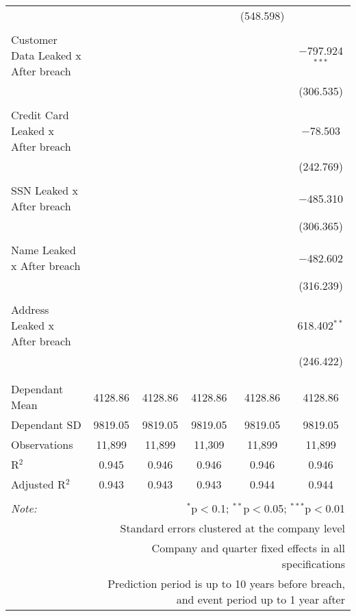 \begin{table}[!htbp]
\begin{tabular}{@{\extracolsep{5pt}}lccccc}
  &  &  &  & (548.598) &  \\ 
  & & & & & \\ 
 Customer Data Leaked x After breach &  &  &  &  & $-$797.924$^{***}$ \\ 
  &  &  &  &  & (306.535) \\ 
  & & & & & \\ 
 Credit Card Leaked x After breach &  &  &  &  & $-$78.503 \\ 
  &  &  &  &  & (242.769) \\ 
  & & & & & \\ 
 SSN Leaked x After breach &  &  &  &  & $-$485.310 \\ 
  &  &  &  &  & (306.365) \\ 
  & & & & & \\ 
 Name Leaked x After breach &  &  &  &  & $-$482.602 \\ 
  &  &  &  &  & (316.239) \\ 
  & & & & & \\ 
 Address Leaked x After breach &  &  &  &  & 618.402$^{**}$ \\ 
  &  &  &  &  & (246.422) \\ 
  & & & & & \\ 
\hline \\[-1.8ex] 
Dependant Mean & 4128.86 & 4128.86 & 4128.86 & 4128.86 & 4128.86 \\ 
Dependant SD & 9819.05 & 9819.05 & 9819.05 & 9819.05 & 9819.05 \\ 
Observations & 11,899 & 11,899 & 11,309 & 11,899 & 11,899 \\ 
R$^{2}$ & 0.945 & 0.946 & 0.946 & 0.946 & 0.946 \\ 
Adjusted R$^{2}$ & 0.943 & 0.943 & 0.943 & 0.944 & 0.944 \\ 
\hline 
\hline \\[-1.8ex] 
\textit{Note:}  & \multicolumn{5}{r}{$^{*}$p$<$0.1; $^{**}$p$<$0.05; $^{***}$p$<$0.01} \\ 
 & \multicolumn{5}{r}{Standard errors clustered at the company level} \\ 
 & \multicolumn{5}{r}{Company and quarter fixed effects in all specifications} \\ 
 & \multicolumn{5}{r}{Prediction period is up to 10 years before breach, and event period up to 1 year after} \\ 
\end{tabular} 
\end{table} 
